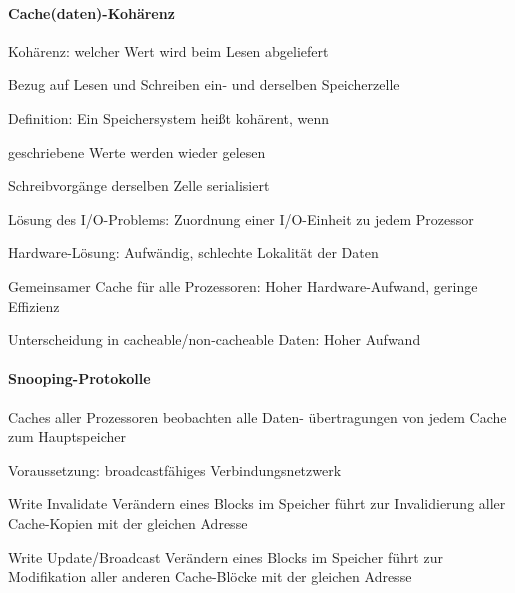 \documentclass[a4paper]{article}
\begin{document}
\begin{multicols}{3}
  \paragraph{Cache(daten)-Kohärenz}
  \begin{itemize*}
    \item Kohärenz: welcher Wert wird beim Lesen abgeliefert
    \item Bezug auf Lesen und Schreiben ein- und derselben Speicherzelle
    \item Definition: Ein Speichersystem heißt kohärent, wenn
    \begin{itemize*}
      \item geschriebene Werte werden wieder gelesen
      \item Schreibvorgänge derselben Zelle serialisiert
    \end{itemize*}
    \item Lösung des I/O-Problems: Zuordnung einer I/O-Einheit zu jedem Prozessor
    \item Hardware-Lösung: Aufwändig, schlechte Lokalität der Daten
    \item Gemeinsamer Cache für alle Prozessoren: Hoher Hardware-Aufwand, geringe Effizienz
    \item Unterscheidung in cacheable/non-cacheable Daten: Hoher Aufwand
  \end{itemize*}
  
  \paragraph{Snooping-Protokolle}
  \begin{itemize*}
    \item Caches aller Prozessoren beobachten alle Daten- übertragungen von jedem Cache zum Hauptspeicher
    \item Voraussetzung: broadcastfähiges Verbindungsnetzwerk
  \end{itemize*}
  \begin{description*}
    \item[Write Invalidate] Verändern eines Blocks im Speicher führt zur Invalidierung aller Cache-Kopien mit der gleichen Adresse
    \item[Write Update/Broadcast] Verändern eines Blocks im Speicher führt zur Modifikation aller anderen Cache-Blöcke mit der gleichen Adresse
  \end{description*}
  

\end{multicols}
\end{document}
